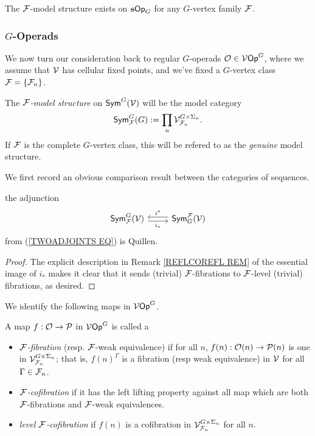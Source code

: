 \documentclass[a4paper,10pt]{article}%
\begin{document}
\begin{example} 
  The $\mathcal F$-model structure exists on $\mathbf{s}\mathsf{Op}_G$ for any $G$-vertex family $\mathcal F$. 
\end{example} 


\newpage
\subsubsection{$G$-Operads}

We now turn our consideration back to regular $G$-operads $\mathcal{O} \in \mathcal V\mathsf{Op}^G$, where we assume that $\mathcal V$ has cellular fixed points, and we've fixed a $G$-vertex class $\mathcal F = \left\{\mathcal F_n\right\}$.

\begin{definition}
  The \textit{$\mathcal F$-model structure} on $\mathsf{Sym}^G(\mathcal V)$ will be the model category
\[
\mathsf{Sym}^G_{\mathcal F}(G) := \prod\limits_n \mathcal V^{G\times \Sigma_n}_{\mathcal F_n}.
\]
If $\mathcal F$ is the complete $G$-vertex class, this will be refered to as the \textit{genuine} model structure.
\end{definition}

We first record an obvious comparison result between the categories of sequences.
\begin{lemma}
  the adjunction
  \[
  \begin{tikzcd}
    \Sym^G_\F(\V) \arrow[r, shift right, "i_*"'] & \Sym^\F_G(\V) \arrow[l, shift right, "i^*"'] 
  \end{tikzcd}
  \]
  from (\ref{TWOADJOINTS EQ}) is Quillen.
\end{lemma}
\begin{proof}
  The explicit description in Remark \ref{REFLCOREFL REM} of the essential image of $i_*$ makes it clear that it sends (trivial) $\mathcal F$-fibrations to $\mathcal F$-level (trivial) fibrations, as desired.
\end{proof}

We identify the following maps in $\mathcal V\mathsf{Op}^G$.
\begin{definition}
  \label{F_MAPS_DEFINITION}
  A map $f: \mathcal{O} \to \mathcal{P}$ in $\mathcal V\mathsf{Op}^G$ is called a
  \begin{itemize}
  \item \textit{$\mathcal F$-fibration} (resp. $\mathcal F$-weak equivalence) if for all $n$, $f(n): \mathcal{O}(n) \to \mathcal{P}(n)$ is one in $\mathcal V^{G \times \Sigma_n}_{\mathcal F_n}$; that is, $f(n)^\Gamma$ is a fibration (resp weak equivalence) in $\mathcal V$ for all $\Gamma \in \mathcal F_n$.
  \item \textit{$\mathcal F$-cofibration} if it has the left lifting property against all map which are both $\mathcal F$-fibrations and $\mathcal F$-weak equivalences. 
  \item \textit{level $\mathcal F$-cofibration} if $f(n)$ is a cofibration in $\mathcal V^{G\times \Sigma_n}_{\mathcal F_n}$ for all $n$.
  \end{itemize}
\end{definition}
\end{document}

